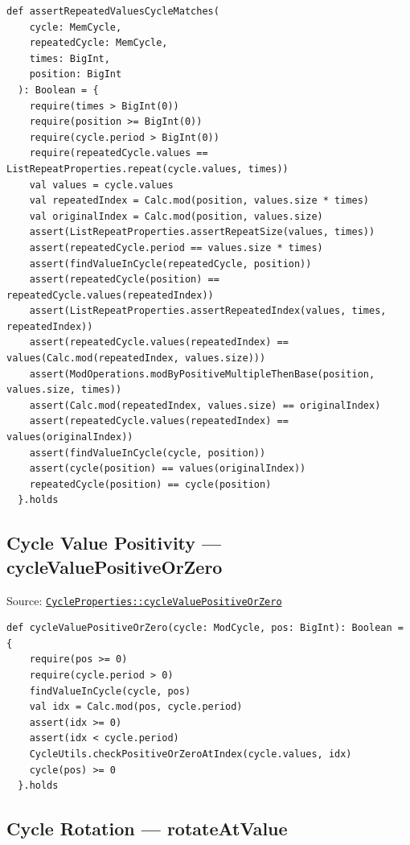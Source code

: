 \begin{lstlisting}[style=scala]
  def assertRepeatedValuesCycleMatches(
    cycle: MemCycle,
    repeatedCycle: MemCycle,
    times: BigInt,
    position: BigInt
  ): Boolean = {
    require(times > BigInt(0))
    require(position >= BigInt(0))
    require(cycle.period > BigInt(0))
    require(repeatedCycle.values == ListRepeatProperties.repeat(cycle.values, times))
    val values = cycle.values
    val repeatedIndex = Calc.mod(position, values.size * times)
    val originalIndex = Calc.mod(position, values.size)
    assert(ListRepeatProperties.assertRepeatSize(values, times))
    assert(repeatedCycle.period == values.size * times)
    assert(findValueInCycle(repeatedCycle, position))
    assert(repeatedCycle(position) == repeatedCycle.values(repeatedIndex))
    assert(ListRepeatProperties.assertRepeatedIndex(values, times, repeatedIndex))
    assert(repeatedCycle.values(repeatedIndex) == values(Calc.mod(repeatedIndex, values.size)))
    assert(ModOperations.modByPositiveMultipleThenBase(position, values.size, times))
    assert(Calc.mod(repeatedIndex, values.size) == originalIndex)
    assert(repeatedCycle.values(repeatedIndex) == values(originalIndex))
    assert(findValueInCycle(cycle, position))
    assert(cycle(position) == values(originalIndex))
    repeatedCycle(position) == cycle(position)
  }.holds
\end{lstlisting}

\subsection{Cycle Value Positivity --- cycleValuePositiveOrZero}

Source:
\href{https://github.com/thiagomata/prime-numbers/blob/cycle-article-v1.0.0/src/main/scala/v1/chapter4/cycle/properties/CycleProperties.scala}{\texttt{CycleProperties::cycleValuePositiveOrZero}}

\begin{lstlisting}[style=scala]
  def cycleValuePositiveOrZero(cycle: ModCycle, pos: BigInt): Boolean = {
    require(pos >= 0)
    require(cycle.period > 0)
    findValueInCycle(cycle, pos)
    val idx = Calc.mod(pos, cycle.period)
    assert(idx >= 0)
    assert(idx < cycle.period)
    CycleUtils.checkPositiveOrZeroAtIndex(cycle.values, idx)
    cycle(pos) >= 0
  }.holds
\end{lstlisting}

\subsection{Cycle Rotation --- rotateAtValue}

